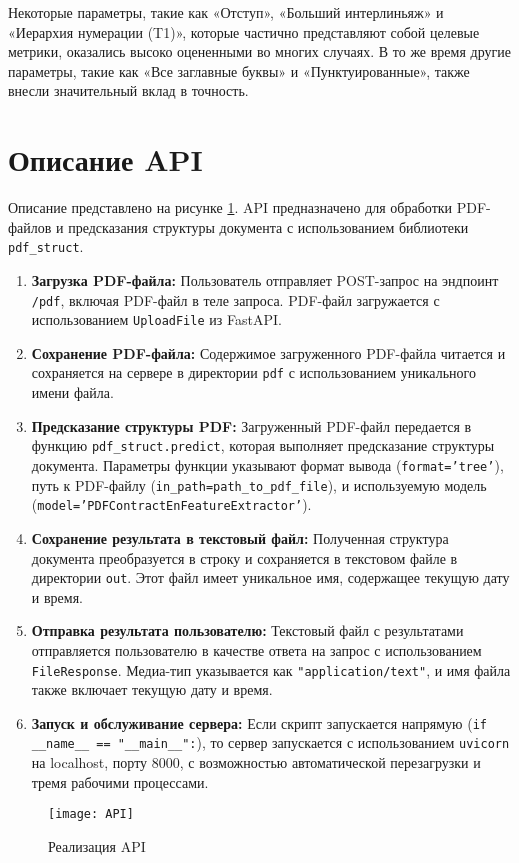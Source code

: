 Некоторые параметры, такие как «Отступ», «Больший интерлиньяж» и «Иерархия нумерации (T1)», которые частично представляют собой целевые метрики, оказались высоко оцененными во многих случаях. В то же время другие параметры, такие как «Все заглавные буквы» и «Пунктуированные», также внесли значительный вклад в точность.
\section{Описание API}
Описание представлено на рисунке \ref{API0}.
API предназначено для обработки PDF-файлов и предсказания структуры документа с использованием библиотеки \texttt{pdf\_struct}.

\begin{enumerate}
    \item \textbf{Загрузка PDF-файла:} Пользователь отправляет POST-запрос на эндпоинт \texttt{/pdf}, включая PDF-файл в теле запроса. PDF-файл загружается с использованием \texttt{UploadFile} из FastAPI.
    
    \item \textbf{Сохранение PDF-файла:} Содержимое загруженного PDF-файла читается и сохраняется на сервере в директории \texttt{pdf} с использованием уникального имени файла.
    
    \item \textbf{Предсказание структуры PDF:} Загруженный PDF-файл передается в функцию \texttt{pdf\_struct.predict}, которая выполняет предсказание структуры документа. Параметры функции указывают формат вывода (\texttt{format='tree'}), путь к PDF-файлу (\texttt{in\_path=path\_to\_pdf\_file}), и используемую модель (\texttt{model='PDFContractEnFeatureExtractor'}).
    
    \item \textbf{Сохранение результата в текстовый файл:} Полученная структура документа преобразуется в строку и сохраняется в текстовом файле в директории \texttt{out}. Этот файл имеет уникальное имя, содержащее текущую дату и время.
    
    \item \textbf{Отправка результата пользователю:} Текстовый файл с результатами отправляется пользователю в качестве ответа на запрос с использованием \texttt{FileResponse}. Медиа-тип указывается как \texttt{"application/text"}, и имя файла также включает текущую дату и время.
    
    \item \textbf{Запуск и обслуживание сервера:} Если скрипт запускается напрямую (\texttt{if \_\_name\_\_ == "\_\_main\_\_":}), то сервер запускается с использованием \texttt{uvicorn} на localhost, порту 8000, с возможностью автоматической перезагрузки и тремя рабочими процессами.
\end{enumerate}
\begin{figure}
  \centering
  \texttt{[image: API]}
  \caption{Реализация API}
  \label{API0}
\end{figure}
